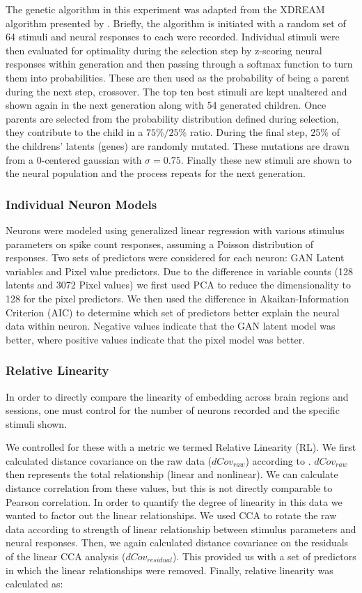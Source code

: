 The genetic algorithm in this experiment was adapted from the XDREAM algorithm presented by \cite{Ponce2019}. Briefly, the algorithm is initiated with a random set of 64 stimuli and neural responses to each were recorded. Individual stimuli were then evaluated for optimality during the selection step by z-scoring neural responses within generation and then passing through a softmax function to turn them into probabilities. These are then used as the probability of being a parent during the next step, crossover. The top ten best stimuli are kept unaltered and shown again in the next generation along with 54 generated children. Once parents are selected from the probability distribution defined during selection, they contribute to the child in a $75\%/25\%$ ratio. During the final step, $25\%$ of the childrens' latents (genes) are randomly mutated. These mutations are drawn from a 0-centered gaussian with $\sigma=0.75$. Finally these new stimuli are shown to the neural population and the process repeats for the next generation.

\subsubsection*{Individual Neuron Models}
Neurons were modeled using generalized linear regression with various stimulus parameters on spike count responses, assuming a Poisson distribution of responses. Two sets of predictors were considered for each neuron: GAN Latent variables and Pixel value predictors. Due to the difference in variable counts (128 latents and 3072 Pixel values) we first used PCA to reduce the dimensionality to 128 for the pixel predictors. We then used the difference in Akaikan-Information Criterion (AIC) to determine which set of predictors better explain the neural data within neuron.
Negative values indicate that the GAN latent model was better, where positive values indicate that the pixel model was better. 

\subsubsection*{Relative Linearity}
\label{methods:relativeLinearity}
In order to directly compare the linearity of embedding across brain regions and sessions, one must control for the number of neurons recorded and the specific stimuli shown.

We controlled for these with a metric we termed Relative Linearity (RL). We first calculated distance covariance on the raw data ($dCov_{raw}$) according to \cite{Cowley2017}. $dCov_{raw}$ then represents the total relationship (linear and nonlinear). We can calculate distance correlation from these values, but this is not directly comparable to Pearson correlation. In order to quantify the degree of linearity in this data we wanted to factor out the linear relationships. We used CCA to rotate the raw data according to strength of linear relationship between stimulus parameters and neural responses. Then, we again calculated distance covariance on the residuals of the linear CCA analysis ($dCov_{residual}$). This provided us with a set of predictors in which the linear relationships were removed. Finally, relative linearity was calculated as:

